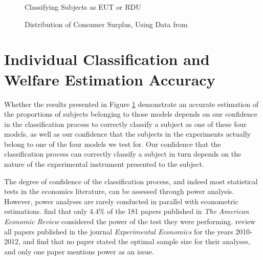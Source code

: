 \documentclass[../main.tex]{subfiles}
\begin{document}
\begin{figure}[h!]
	\center
	\caption{Classifying Subjects as EUT or RDU}
	\label{fig:HNG_pvals}
\end{figure}

\begin{figure}[h!]
	\center
	\caption{Distribution of Consumer Surplus, Using Data from \textcite{Harrison2016}}
	\label{fig:HNG_CS}
\end{figure}

\section{Individual Classification and Welfare Estimation Accuracy}
\label{sec4:IC}

Whether the results presented in Figure \ref{fig:HNG_pvals} demonstrate an accurate estimation of the proportions of subjects belonging to those models depends on our confidence in the classification process to correctly classify a subject as one of these four models, as well as our confidence that the subjects in the experiments actually belong to one of the four models we test for.
Our confidence that the classification process can correctly classify a subject in turn depends on the nature of the experimental instrument presented to the subject.

The degree of confidence of the classification process, and indeed most statistical tests in the economics literature, can be assessed through power analysis.
However, power analyses are rarely conducted in parallel with econometric estimations.
\textcite{McCloskey1996} find that only 4.4\% of the 181 papers published in \textit{The American Economic Review} considered the power of the test they were performing.
\textcite[6]{Zhang2013} review all papers published in the journal \textit{Experimental Economics} for the years 2010-2012, and find that no paper stated the optimal sample size for their analyses, and only one paper mentions power as an issue.
\end{document}

